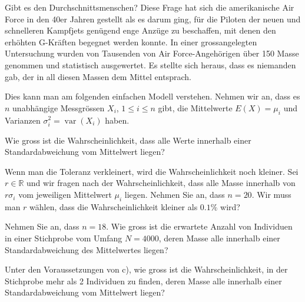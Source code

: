 Gibt es den Durchschnittsmenschen? 
Diese Frage hat sich die amerikanische Air Force in den 40er Jahren gestellt
als es darum ging, für die Piloten der neuen und schnelleren Kampfjets
genügend enge Anzüge zu beschaffen, mit denen den erhöhten G-Kräften
begegnet werden konnte.
In einer grossangelegten Untersuchung wurden von Tausenden von
Air Force-Angehörigen über 150 Masse genommen und statistisch ausgewertet.
Es stellte sich heraus, dass es niemanden gab, der in all diesen Massen
dem Mittel entsprach.

Dies kann man am folgenden einfachen Modell verstehen.
Nehmen wir an, dass es $n$ unabhängige Messgrössen $X_i$, $1\le i\le n$  gibt,
die Mittelwerte $E(X) = \mu_i$ und Varianzen
$\sigma_i^2 = \operatorname{var}(X_i)$ haben.


\begin{teilaufgaben}
\item
Wie gross ist die Wahrscheinlichkeit, dass alle Werte innerhalb einer
Standardabweichung vom Mittelwert liegen?
\item
Wenn man die Toleranz verkleinert, wird die Wahrscheinlichkeit noch kleiner.
Sei $r\in\mathbb R$ und wir fragen nach der Wahrscheinlichkeit, dass alle
Masse innerhalb von $r\sigma_i$ vom jeweiligen Mittelwert $\mu_i$ liegen.
Nehmen Sie an, dass $n=20$.
Wir muss man $r$ wählen, dass die Wahrscheinlichkeit kleiner als $0.1\%$
wird?
\item
Nehmen Sie an, dass $n=18$.
Wie gross ist die erwartete Anzahl von Individuen in einer Stichprobe
vom Umfang $N=4000$, deren Masse alle innerhalb einer Standardabweichung
des Mittelwertes liegen?
\item
Unter den Voraussetzungen von c), wie gross ist die Wahrscheinlichkeit,
in der Stichprobe mehr als 2 Individuen zu finden, deren Masse alle
innerhalb einer Standardabweichung vom Mittelwert liegen?
\end{teilaufgaben}

